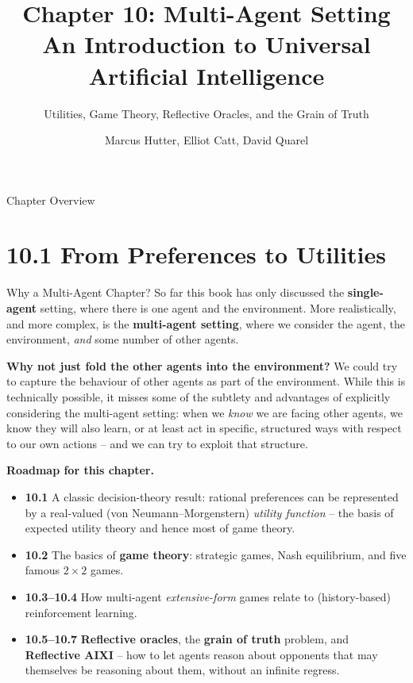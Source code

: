 \documentclass[aspectratio=169,10pt]{beamer}
\title[Ch.\,10 Multi-Agent Setting]{%
  \textbf{Chapter 10: Multi-Agent Setting}\\
  \normalsize An Introduction to Universal Artificial Intelligence}
\subtitle{Utilities, Game Theory, Reflective Oracles, and the Grain of Truth}
\author{Marcus Hutter, Elliot Catt, David Quarel}
\institute{Taylor \& Francis / CRC Press, 2024}
\date{}
\begin{document}
\begin{frame}
  \titlepage
\end{frame}

\begin{frame}{Chapter Overview}
  \tableofcontents
\end{frame}


\section{10.1 From Preferences to Utilities}

\begin{frame}{Why a Multi-Agent Chapter?}
  So far this book has only discussed the \textbf{single-agent} setting,
  where there is one agent and the environment. More realistically, and
  more complex, is the \textbf{multi-agent setting}, where we consider the
  agent, the environment, \emph{and} some number of other agents.

  \vspace{0.4em}
  \textbf{Why not just fold the other agents into the environment?} We
  could try to capture the behaviour of other agents as part of the
  environment. While this is technically possible, it misses some of the
  subtlety and advantages of explicitly considering the multi-agent
  setting: when we \emph{know} we are facing other agents, we know they will
  also learn, or at least act in specific, structured ways with respect to
  our own actions -- and we can try to exploit that structure.

  \vspace{0.4em}
  \textbf{Roadmap for this chapter.}
  \begin{itemize}
    \item \textbf{10.1} A classic decision-theory result: rational
      preferences can be represented by a real-valued (von
      Neumann--Morgenstern) \emph{utility function} -- the basis of
      expected utility theory and hence most of game theory.
    \item \textbf{10.2} The basics of \textbf{game theory}: strategic
      games, Nash equilibrium, and five famous $2\times2$ games.
    \item \textbf{10.3--10.4} How multi-agent \emph{extensive-form} games
      relate to (history-based) reinforcement learning.
    \item \textbf{10.5--10.7} \textbf{Reflective oracles}, the
      \textbf{grain of truth} problem, and \textbf{Reflective AIXI} --
      how to let agents reason about opponents that may themselves be
      reasoning about them, without an infinite regress.
  \end{itemize}
\end{frame}
\end{document}
